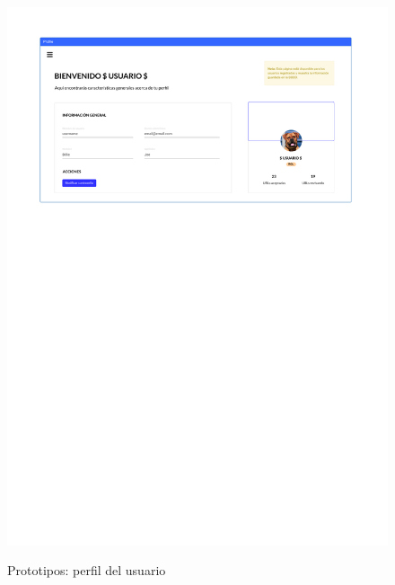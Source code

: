 \begin{figure}[h]
	\caption{Prototipos: perfil del usuario}
	\centering
	\includegraphics[width=\textwidth]{../img/anexos/mockups/4-mockups-profile}
	\label{mock:profile}
\end{figure}

